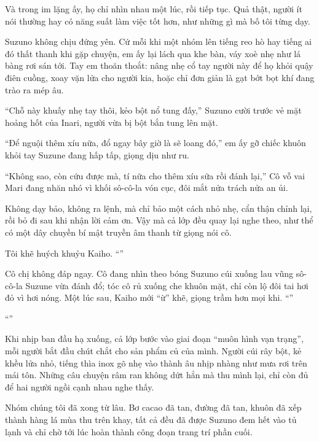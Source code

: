 \documentclass[../main.tex]{subfiles}
\begin{document}
Và trong im lặng ấy, họ chỉ nhìn nhau một lúc, rồi tiếp tục. Quả thật, người ít nói thường hay có năng suất làm việc tốt hơn, như những gì mà bố tôi từng dạy.

Suzuno không chịu đứng yên. Cứ mỗi khi một nhóm lên tiếng reo hò hay tiếng ai đó thất thanh khi gặp chuyện, em ấy lại lách qua khe bàn, váy xoè nhẹ như lá bàng rơi sán tới. Tay em thoăn thoắt: nâng nhẹ cổ tay người này để họ khỏi quậy điên cuồng, xoay vặn lửa cho người kia, hoặc chỉ đơn giản là gạt bớt bọt khí đang trào ra mép âu.

``Chỗ này khuấy nhẹ tay thôi, kẻo bột nổ tung đấy,'' Suzuno cười trước vẻ mặt hoảng hốt của Inari, người vừa bị bột bắn tung lên mặt.

``Để nguội thêm xíu nữa, đổ ngay bây giờ là sẽ loang đó,'' em ấy gỡ chiếc khuôn khỏi tay Suzune đang hấp tấp, giọng dịu như ru.

``Không sao, còn cứu được mà, tí nữa cho thêm xíu sữa rồi đánh lại,'' Cô vỗ vai Mari đang nhăn nhó vì khối sô-cô-la vón cục, đôi mắt nửa trách nửa an ủi.

Không dạy bảo, không ra lệnh, mà chỉ bảo một cách nhỏ nhẹ, cẩn thận chỉnh lại, rồi bỏ đi sau khi nhận lời cảm ơn. Vậy mà cả lớp đều quay lại nghe theo, như thể có một dây chuyền bí mật truyền âm thanh từ giọng nói cô.

Tôi khẽ huých khuỷu Kaiho. ``''

Cô chị không đáp ngay. Cô đang nhìn theo bóng Suzuno cúi xuống lau vũng sô-cô-la Suzune vừa đánh đổ; tóc cô rủ xuống che khuôn mặt, chỉ còn lộ đôi tai hơi đỏ vì hơi nóng. Một lúc sau, Kaiho mới ``ừ'' khẽ, giọng trầm hơn mọi khi. ``''

``''

Khi nhịp ban đầu hạ xuống, cả lớp bước vào giai đoạn ``muôn hình vạn trạng'', mỗi người bắt đầu chút chắt cho sản phẩm củ của mình. Người cúi rây bột, kẻ khều lửa nhỏ, tiếng thìa inox gõ nhẹ vào thành âu nhịp nhàng như mưa rơi trên mái tôn. Những câu chuyện râm ran không dứt hẳn mà thu mình lại, chỉ còn đủ để hai người ngồi cạnh nhau nghe thấy.

Nhóm chúng tôi đã xong từ lâu. Bơ cacao đã tan, đường đã tan, khuôn đã xếp thành hàng lá mùa thu trên khay, tất cả đều đã được Suzuno đem hết vào tủ lạnh và chỉ chờ tới lúc hoàn thành công đoạn trang trí phần cuối.
\end{document}
